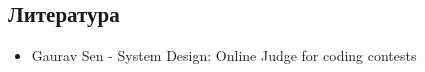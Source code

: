 

\subsection{Литература}
\begin{itemize}
    \item Gaurav Sen - System Design: Online Judge for coding contests
\end{itemize}

\listoffigures